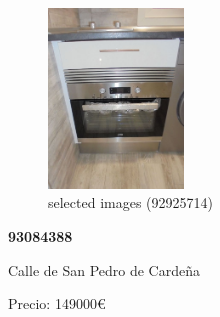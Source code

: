 \documentclass[10pt,a4paper]{report}
\begin{document}
\begin{figure}[htbp]
\includegraphics[width=0.32\textwidth]{arfima/92925714/92925714-006.jpg}
\caption{selected images (92925714)}
\end{figure}
\newpage
\begin{center}
\begin{large}
\textbf{93084388}\\[10px]
\end{large}
Calle de San Pedro de Cardeña
\end{center}
Precio: 149000€
\end{document}
